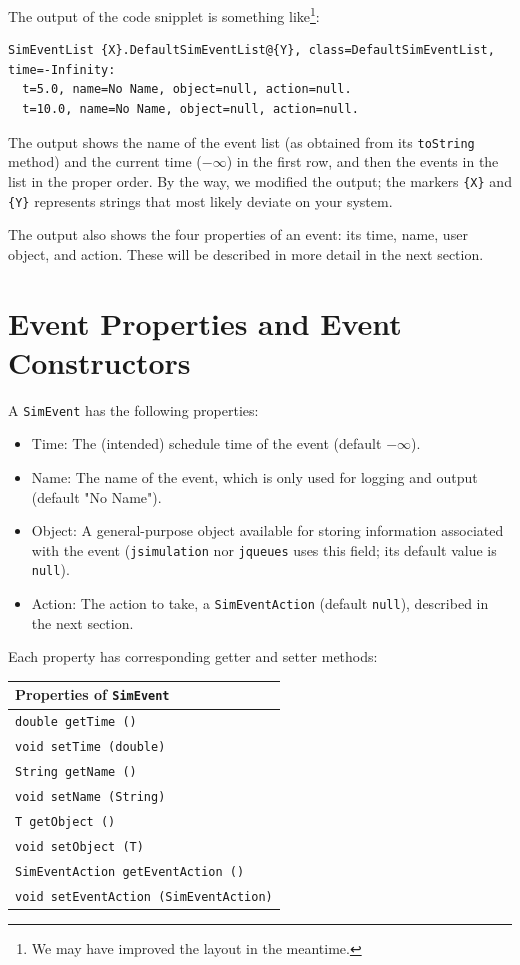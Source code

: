 \documentclass[12pt]{book}
\begin{document}
The output of the code snipplet is something like\footnote{
We may have improved the layout in the meantime.}:
\begin{lstlisting}[basicstyle=\tiny]
SimEventList {X}.DefaultSimEventList@{Y}, class=DefaultSimEventList, time=-Infinity:
  t=5.0, name=No Name, object=null, action=null.
  t=10.0, name=No Name, object=null, action=null.
\end{lstlisting}
The output shows the name of the event list (as obtained from its \lstinline{toString} method)
  and the current time ($-\infty$) in the first row, and then the events in the list
  in the proper order.
By the way, we modified the output; the markers \lstinline|{X}| and \lstinline|{Y}|
  represents strings that most likely deviate on your system.

The output also shows the four properties of an event: its time, name, user object, and action.
These will be described in more detail in the next section.

\section{Event Properties and Event Constructors}

A \lstinline{SimEvent} has the following properties:
\begin{itemize}
\item Time:   The (intended) schedule time of the event (default $-\infty$).
\item Name:   The name of the event, which is only used for logging and output (default "No Name").
\item Object: A general-purpose object available for storing information associated with the event
              (\lstinline{jsimulation} nor \lstinline{jqueues} uses this field; its
              default value is \lstinline{null}).
\item Action: The action to take, a \lstinline{SimEventAction} (default \lstinline{null}),
                described in the next section.
\end{itemize}
Each property has corresponding getter and setter methods:

\begin{tabular}{|l|}
  \hline
  {\bf Properties of \lstinline|SimEvent|} \\
  \hline
  \lstinline[basicstyle=\footnotesize]!double getTime ()! \\
  \lstinline[basicstyle=\footnotesize]!void setTime (double)! \\
  \hline
  \lstinline[basicstyle=\footnotesize]!String getName ()! \\
  \lstinline[basicstyle=\footnotesize]!void setName (String)! \\
  \hline
  \lstinline[basicstyle=\footnotesize]!T getObject ()! \\
  \lstinline[basicstyle=\footnotesize]!void setObject (T)! \\
  \hline
  \lstinline[basicstyle=\footnotesize]!SimEventAction getEventAction ()! \\
  \lstinline[basicstyle=\footnotesize]!void setEventAction (SimEventAction)! \\
  \hline
\end{tabular}
\end{document}
